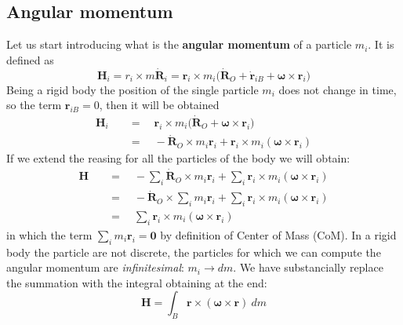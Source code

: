 \subsection{Angular momentum}
Let us start introducing what is the \textbf{angular momentum} of a particle $m_i$. It is defined as 
\begin{equation}
    \mathbf{H}_i=r_i\times m\dot{\mathbf{R}}_i=
    \mathbf{r}_i \times m_i \big( 
        \dot{\mathbf{R}}_O + 
        \dot{\mathbf{r}}_{iB}+\boldsymbol{\omega}\times\mathbf{r}_i
    \big)
\end{equation}
Being a rigid body the position of the single particle $m_i$ does not change in time, so the term $\mathbf{r}_{iB}=0$, then it will be obtained
\begin{align*}
    \mathbf{H}_i \quad &= \quad \mathbf{r}_i \times m_i 
        \bigg( \dot{\mathbf{R}}_O +\boldsymbol{\omega}\times\mathbf{r}_i\bigg)\\
        &= \quad -\dot{\mathbf{R}}_O\times m_i\mathbf{r}_i+\mathbf{r}_i\times m_i(\boldsymbol{\omega}\times\mathbf{r}_i)
\end{align*}
If we extend the reasing for all the particles of the body we will obtain:
\begin{align*}
    \mathbf{H} \quad &= \quad 
    -\sum_i \dot{\mathbf{R}}_O\times m_i\mathbf{r}_i+
    \sum_i\mathbf{r}_i\times m_i(\boldsymbol{\omega}\times\mathbf{r}_i)\\
    &=\quad -\dot{\mathbf{R}}_O\times \sum_i  m_i\mathbf{r}_i+
    \sum_i\mathbf{r}_i\times m_i(\boldsymbol{\omega}\times\mathbf{r}_i)\\
    &=\quad \sum_i\mathbf{r}_i\times m_i(\boldsymbol{\omega}\times\mathbf{r}_i)
\end{align*}
in which the term $\sum_i  m_i\mathbf{r}_i=\mathbf{0}$ by definition of Center of Mass (CoM). In a rigid body the particle are not discrete, the particles for which we can compute the angular momentum are \textit{infinitesimal}: $m_i\to dm$. We have substancially replace the summation with the integral obtaining at the end:
\begin{equation}
    \mathbf{H} = \int_B{\mathbf{r}\times (\boldsymbol{\omega}\times\mathbf{r})} \ dm
\end{equation}

